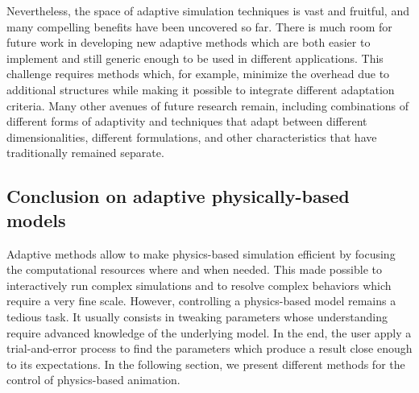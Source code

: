 Nevertheless, the space of adaptive simulation techniques is vast and fruitful, and many compelling benefits have been uncovered so far.
There is much room for future work in developing new adaptive methods which are both easier to implement and still generic enough to be used in different applications. This challenge requires methods which, for example, minimize the overhead due to additional structures while making it possible to integrate different adaptation criteria.
Many other avenues of future research remain, including combinations of different forms of adaptivity and techniques that adapt between different dimensionalities, different formulations, and other characteristics that have traditionally remained separate.

\subsection{Conclusion on adaptive physically-based models}
Adaptive methods allow to make physics-based simulation efficient by focusing the computational resources where and when needed. 
This made possible to interactively run complex simulations and to resolve complex behaviors which require a very fine scale.
However, controlling a physics-based model remains a tedious task. 
It usually consists in tweaking parameters whose understanding require advanced knowledge of the underlying model. 
In the end, the user apply a trial-and-error process to find the parameters which produce a result close enough to its expectations.
In the following section, we present different methods for the control of physics-based animation.

